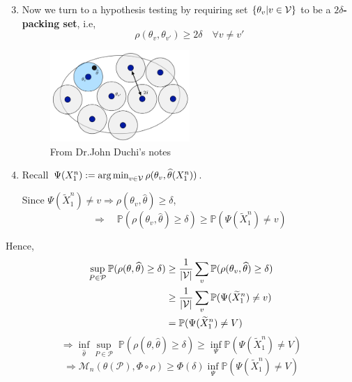 \documentclass[10pt,xcolor={usenames,dvipsnames,table},aspectratio=169]{beamer}
\begin{document}
\begin{frame}
\begin{enumerate}
    \setcounter{enumi}{2}
\item Now we turn to a hypothesis testing by requiring set $\left\{\theta_v | v \in \mathcal{V}\right\}$ to be a \textbf{$2\delta$-packing set}, i.e,
    \[
    \rho(\theta_v, \theta_{v'}) \geq 2 \delta \quad \forall  v \neq v'
    \] 
    \begin{figure}
        \centering
        \includegraphics[width=0.5\textwidth]{figures/packing-set.png}
        \caption{From Dr.John Duchi's notes}
    \end{figure}
\item 

    Recall $\Psi(X_1^{n}) := \operatorname*{arg\,min}_{v \in \mathcal{V}} \rho(\theta_v, \widehat{\theta}(X_1^{n}))$.

    Since $\Psi(\widetilde{X}_1^{n}) \neq v \Rightarrow \rho(\theta_v, \widehat{\theta}) \geq \delta$,
    \[
    \Rightarrow \quad \mathbb{P}(\rho(\theta_v, \widehat{\theta}) \geq \delta) \geq \mathbb{P}(\Psi(\widetilde{X}_1^{n}) \neq v)
    \] 
    \end{enumerate}
\end{frame}

\begin{frame}
    Hence,
    \begin{align*}
    \sup_{P \in \mathcal{P}} \mathbb{P}(\rho(\theta, \widehat{\theta}) \geq \delta) 
    &\geq \dfrac{1}{\left\lvert\mathcal{V}\right\rvert} \sum_{v}  \mathbb{P}(\rho(\theta_v, \widehat{\theta}) \geq \delta) \\
    &\geq \dfrac{1}{\left\lvert\mathcal{V}\right\rvert} \sum_{v}  \mathbb{P}(\Psi(\widetilde{X}_1^{n}) \neq v) \\
    &= \mathbb{P}(\Psi(\widetilde{X}_1^{n}) \neq V)
    \end{align*} 
    \[
    \Rightarrow \inf_{\widehat{\theta}} \sup_{P \in \mathcal{P}} \; \mathbb{P}(\rho(\theta, \widehat{\theta}) \geq \delta) 
    \geq \inf_{\Psi} \mathbb{P}(\Psi(\widetilde{X}_1^{n}) \neq V)
    \] 
    \[
    \Rightarrow \mathcal{M}_n(\theta(\mathcal{P}), \Phi \circ \rho) \geq \Phi(\delta) \inf_{\Psi} \mathbb{P}(\Psi(\widetilde{X}_1^{n}) \neq V)
    \] 
\end{frame}
\end{document}
